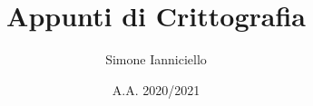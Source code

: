 \documentclass[a4paper,11pt,twoside]{book}
\begin{document}
\title{Appunti di Crittografia}
\author{Simone Ianniciello}
\date{A.A. 2020/2021}
\maketitle

\tableofcontents






\end{document}
